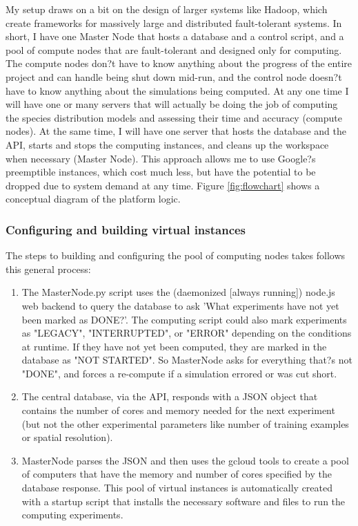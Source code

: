 \documentclass[a4paper]{article}
\begin{document}
My setup draws on a bit on the design of larger systems like Hadoop, which create frameworks for massively large and distributed fault-tolerant systems. In short, I have one Master Node that hosts a database and a control script, and a pool of compute nodes that are fault-tolerant and designed only for computing. The compute nodes don?t have to know anything about the progress of the entire project and can handle being shut down mid-run, and the control node doesn?t have to know anything about the simulations being computed.  At any one time I will have one or many servers that will actually be doing the job of computing the species distribution models and assessing their time and accuracy (compute nodes). At the same time, I will have one server that hosts the database and the API, starts and stops the computing instances, and cleans up the workspace when necessary (Master Node). This approach allows me to use Google?s preemptible instances, which cost much less, but have the potential to be dropped due to system demand at any time. Figure \ref{fig:flowchart} shows a conceptual diagram of the platform logic.

\subsubsection{Configuring and building virtual instances}
The steps to building and configuring the pool of computing nodes takes follows this general process: 
\begin{enumerate}
\item The MasterNode.py script uses the (daemonized [always running]) node.js web backend to query the database to ask 'What experiments have not yet been marked as DONE?'. The computing script could also mark experiments as "LEGACY", "INTERRUPTED", or "ERROR" depending on the conditions at runtime. If they have not yet been computed, they are marked in the database as "NOT STARTED". So MasterNode asks for everything that?s not "DONE", and forces a re-compute if a simulation errored or was cut short.
\item The central database, via the API, responds with a JSON object that contains the number of cores and memory needed for the next experiment (but not the other experimental parameters like number of training examples or spatial resolution).
\item MasterNode parses the JSON and then uses the gcloud tools to create a pool of computers that have the memory and number of cores specified by the database response. This pool of virtual instances is automatically created with a startup script that installs the necessary software and files to run the computing experiments.
\end{enumerate}
\end{document}
